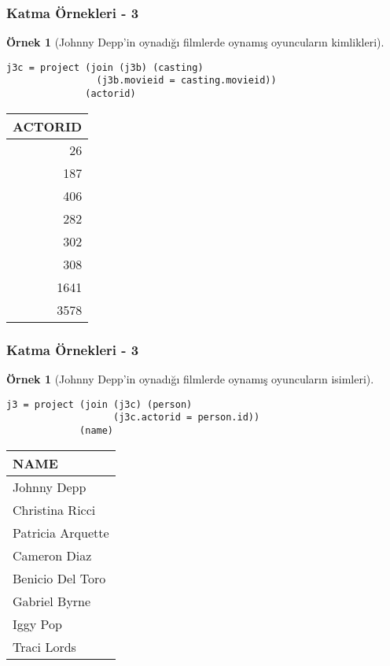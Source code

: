 \documentclass[dvipsnames]{beamer}
\theoremstyle{definition}
\theoremstyle{example}
\newtheorem{ornek}[theorem]{Örnek}
\theoremstyle{plain}
\begin{document}
\begin{frame}[fragile]
  \frametitle{Katma Örnekleri - 3}

  \begin{ornek}[Johnny Depp'in oynadığı filmlerde oynamış oyuncuların
                kimlikleri]
    \begin{lstlisting}
j3c = project (join (j3b) (casting)
                (j3b.movieid = casting.movieid))
              (actorid)
    \end{lstlisting}

    \pause
    \begin{tiny}
    \begin{table}
      \begin{tabular}{|r|}\hline
ACTORID \\\hline\hline
     26 \\\hline
    187 \\\hline
    406 \\\hline
    282 \\\hline
    302 \\\hline
    308 \\\hline
   1641 \\\hline
   3578 \\\hline
      \end{tabular}
    \end{table}
    \end{tiny}
  \end{ornek}
\end{frame}

\begin{frame}[fragile]
  \frametitle{Katma Örnekleri - 3}

  \begin{ornek}[Johnny Depp'in oynadığı filmlerde oynamış oyuncuların isimleri]
    \begin{lstlisting}
j3 = project (join (j3c) (person)
                   (j3c.actorid = person.id))
             (name)
    \end{lstlisting}

    \pause
    \begin{tiny}
    \begin{table}
      \begin{tabular}{|l|}\hline
NAME             \\\hline\hline
Johnny Depp      \\\hline
Christina Ricci  \\\hline
Patricia Arquette\\\hline
Cameron Diaz     \\\hline
Benicio Del Toro \\\hline
Gabriel Byrne    \\\hline
Iggy Pop         \\\hline
Traci Lords      \\\hline
      \end{tabular}
    \end{table}
    \end{tiny}
  \end{ornek}
\end{frame}
\end{document}
